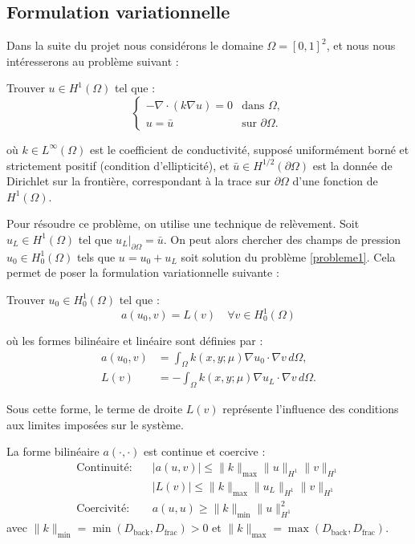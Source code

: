\documentclass[12pt,a4paper]{article}
\begin{document}
\subsection{Formulation variationnelle}


Dans la suite du projet nous considérons le domaine $\Omega=[0,1]^2$, et nous nous intéresserons au problème suivant :

Trouver $u \in H^1(\Omega)$ tel que :
\begin{equation}
  \label{probleme1}
  \begin{cases}
      -\nabla \cdot (k \nabla u) = 0 & \text{dans } \Omega, \\ 
      u = \bar{u} & \text{sur } \partial \Omega.
  \end{cases}
\end{equation}

où $k \in L^\infty(\Omega)$ est le coefficient de conductivité, supposé uniformément borné et strictement positif (condition d'ellipticité), et $\bar{u} \in H^{1/2}(\partial \Omega)$ est la donnée de Dirichlet sur la frontière, correspondant à la trace sur $\partial \Omega$ d'une fonction de $H^1(\Omega)$.

Pour résoudre ce problème, on utilise une technique de relèvement. Soit $u_L \in H^1(\Omega)$ tel que $u_L|_{\partial \Omega} = \bar{u}$. On peut alors chercher des champs de pression $u_0 \in H_0^1(\Omega)$ tels que $u = u_0 + u_L$ soit solution du problème \eqref{probleme1}. Cela permet de poser la formulation variationnelle suivante :

Trouver $u_0 \in H_0^1(\Omega)$ tel que :
\begin{equation*}
    a(u_0, v) = L(v) \quad \forall v \in H_0^1(\Omega)
\end{equation*}

où les formes bilinéaire et linéaire sont définies par :
\begin{align}
    a(u_0, v) &= \int_{\Omega} k(x, y; \mu) \nabla u_0 \cdot \nabla v \, d\Omega, \\
    L(v) &= -\int_{\Omega} k(x, y; \mu) \nabla u_L \cdot \nabla v \, d\Omega.
\end{align}



Sous cette forme, le terme de droite $L(v)$ représente l'influence des conditions aux limites imposées sur le système.

La forme bilinéaire $a(\cdot, \cdot)$ est continue et coercive :
\begin{align}
    \text{Continuité:} &\quad |a(u, v)| \leq \|k\|_{\max} \| u\|_                   {H^1} \| v\|_{H^1} \\
                        &\quad |L(v)| \leq \|k\|_{\max} \|u_L\|_{H^1}\| v\|_{H^1}  \\
    \text{Coercivité:} &\quad a(u, u) \geq \|k\|_{\min} \| u\|_{H^1}^2
\end{align}
avec $\|k\|_{\min} = \min(D_{\text{back}}, D_{\text{frac}}) > 0$ et $\|k\|_{\max} = \max(D_{\text{back}}, D_{\text{frac}})$.
\end{document}
